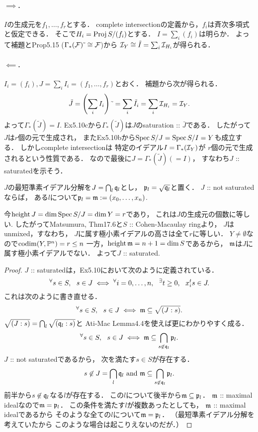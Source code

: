 \documentclass[a4paper]{jsarticle}
\begin{document}
    \paragraph{$\implies$.}
    $I$の生成元を$f_1,\dots,f_r$とする．
    complete intersectionの定義から，$f_i$は斉次多項式と仮定できる．
    そこで$H_i=\operatorname{Proj} S/(f_i)$とする．
    $I=\sum_i (f_i)$は明らか．
    よって補題とProp5.15 ($\Gamma_*(\mathcal{F})\,\tilde{}\, \cong \mathcal{F}$)から
    $\mathcal{I}_Y \cong \tilde{I}=\sum_i \mathcal{I}_{H_i}$が得られる．

    \paragraph{$\impliedby$.}
    $I_i=(f_i), J=\sum_i I_i=(f_1,\dots,f_r)$とおく．
    補題から次が得られる．
    \[ \tilde{J}=\left( \sum_i I_i \right)\,\tilde{}\,=\sum_i \tilde{I}_i=\sum_i \mathcal{I}_{H_i}=\mathcal{I}_Y. \]
    よって$\Gamma_*(\tilde{J})=I$.
    Ex5.10cから$\Gamma_*(\tilde{J})$は$J$のsaturation :: $\bar{J}$である．
    したがって$J$は$r$個の元で生成され，
    またEx5.10bから$\operatorname{Spec} S/J=\operatorname{Spec} S/I=Y$も成立する．
    しかしcomplete intersectionは
    特定のイデアル$I=\Gamma_*(\mathcal{I}_Y)$が
    $r$個の元で生成されるという性質である．
    なので最後に$J=\Gamma_*(\tilde{J})(=I)$，
    すなわち$J$ :: saturatedを示そう．
    \begin{Claim}
        $J$の最短準素イデアル分解を$J=\bigcap_l \mathfrak{q}_l$とし，
        $\mathfrak{p}_l=\sqrt{\mathfrak{q}_l}$と置く．
        $J$ :: not saturatedならば，
        ある$l$について$\mathfrak{p}_l=\mathfrak{m}:=(x_0,\dots,x_n)$.
    \end{Claim}
    今$\operatorname{height} J=\dim \operatorname{Spec} S/J=\dim Y=r$であり，
    これは$J$の生成元の個数に等しい.
    したがってMatsumura, Thm17.6と$S$ :: Cohen-Macaulay ringより，
    $J$はunmixed，すなわち，
    $J$に属す極小素イデアルの高さは全て$r$に等しい．
    $Y \neq \emptyset$なので$\operatorname{codim}(Y, \mathbb{P}^n)=r \leq n$
    一方，$\operatorname{height} \mathfrak{m}=n+1=\dim S$であるから，
    $\mathfrak{m}$は$J$に属す極小素イデアルでない．
    よって$J$ :: saturated.
    \begin{proof}
        $J$ :: saturatedは，Ex5.10において次のように定義されている．
        \[
            {}^{\forall} s \in S,~~
            s \in J
            \iff
            {}^{\forall} i=0,\dots,n,~~ {}^{\exists} t \geq 0,~~ x_i^t s \in J.
        \]
        これは次のように書き直せる．
        \[ {}^{\forall} s \in S,~~ s \in J \iff \mathfrak{m} \subseteq \sqrt{(J:s)}. \]
        $\sqrt{(J:s)}=\bigcap_l \sqrt{(\mathfrak{q}_l:s)}$と
        Ati-Mac Lemma4.4を使えば更にわかりやすく成る．
        \[ {}^{\forall} s \in S,~~ s \in J \iff \mathfrak{m} \subseteq \bigcap_{s \not \in \mathfrak{q}_l} \mathfrak{p}_l. \]
        $J$ :: not saturatedであるから，
        次を満たす$s \in S$が存在する．
        \[ s \not \in J=\bigcap_l \mathfrak{q}_l \text{ and } \mathfrak{m} \subseteq \bigcap_{s \not \in \mathfrak{q}_l} \mathfrak{p}_l. \]
        前半から$s \not \in \mathfrak{q}_l$なる$l$が存在する．
        この$l$について後半から$\mathfrak{m} \subseteq \mathfrak{p}_l$．
        $\mathfrak{m}$ :: maximal idealなので$\mathfrak{m}=\mathfrak{p}_l$．
        この条件を満たす$l$が複数あったとしても，
        $\mathfrak{m}$ :: maximal idealであるから
        そのような全ての$l$について$\mathfrak{m}=\mathfrak{p}_l$．
        （最短準素イデアル分解を考えていたから
        このような場合は起こりえないのだが．）
    \end{proof}
\end{document}
